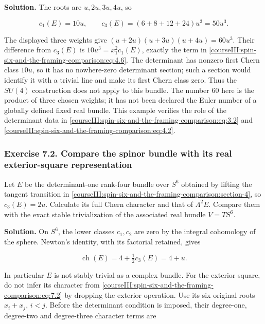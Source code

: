 \textbf{Solution.} The roots are \(u,2u,3u,4u\), so

\begin{equation}
c_1(E)=10u,\qquad
c_3(E)=(6+8+12+24)u^3=50u^3.
\label{courseIII:spin-six-and-the-framing-comparison:eq:7.1}
\end{equation}

The displayed three weights give \((u+2u)(u+3u)(u+4u)=60u^3\). Their difference from \(c_3(E)\) is \(10u^3=x_1^2c_1(E)\), exactly the term in \eqref{courseIII:spin-six-and-the-framing-comparison:eq:4.6}. The determinant has nonzero first Chern class \(10u\), so it has no nowhere-zero determinant section; such a section would identify it with a trivial line and make its first Chern class zero. Thus the \(SU(4)\) construction does not apply to this bundle. The number \(60\) here is the product of three chosen weights; it has not been declared the Euler number of a globally defined fixed real bundle. This example verifies the role of the determinant data in \eqref{courseIII:spin-six-and-the-framing-comparison:eq:3.2} and \eqref{courseIII:spin-six-and-the-framing-comparison:eq:4.2}.

\subsubsection{Exercise 7.2. Compare the spinor bundle with its real exterior-square representation}
\label{courseIII:spin-six-and-the-framing-comparison:exercise-7.2}

\label{courseIII:spin6:7.2}

Let \(E\) be the determinant-one rank-four bundle over \(S^6\) obtained by lifting the tangent transition in \cref{courseIII:spin-six-and-the-framing-comparison:section-4}, so \(c_3(E)=2u\). Calculate its full Chern character and that of \(\Lambda^2E\). Compare them with the exact stable trivialization of the associated real bundle \(V=TS^6\).

\textbf{Solution.} On \(S^6\), the lower classes \(c_1,c_2\) are zero by the integral cohomology of the sphere. Newton's identity, with its factorial retained, gives

\begin{equation}
\operatorname{ch}(E)=4+\tfrac12c_3(E)=4+u.
\label{courseIII:spin-six-and-the-framing-comparison:eq:7.2}
\end{equation}

In particular \(E\) is not stably trivial as a complex bundle. For the exterior square, do not infer its character from \eqref{courseIII:spin-six-and-the-framing-comparison:eq:7.2} by dropping the exterior operation. Use its six original roots \(x_i+x_j\), \(i<j\). Before the determinant condition is imposed, their degree-one, degree-two and degree-three character terms are


